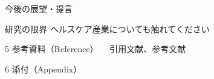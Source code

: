 \documentclass[a4j,11pt,mc, twocolumn]{jreport}
\begin{document}
今後の展望・提言


研究の限界
 ヘルスケア産業についても触れてください


5 参考資料（Reference）
 　引用文献、参考文献

6 添付（Appendix）











\newpage
\makeatletter
\renewcommand{\@biblabel}[1]{[#1]}
\makeatother



\end{document}
